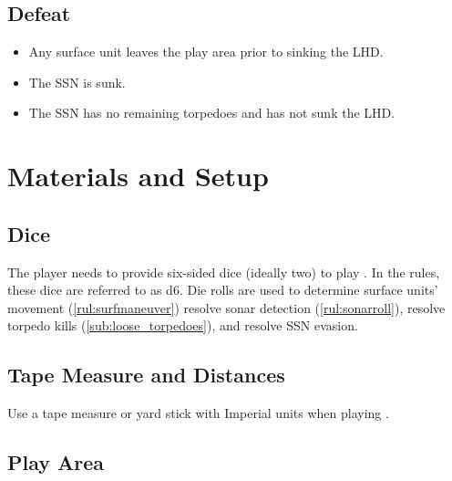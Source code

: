 \documentclass[../TacSubMicroRules.tex]{subfiles}
\begin{document}
\subsection{Defeat}%
\label{sub:defeat}

\begin{itemize}
    \item Any surface unit leaves the play area prior to sinking the LHD.
    \item The SSN is sunk.
    \item The SSN has no remaining torpedoes and has not sunk the LHD.
\end{itemize}

\section{Materials and Setup}%
\label{sec:materialssetup}


\subsection{Dice}%
\label{sub:external_materials}

The player needs to provide six-sided dice (ideally two) to play \gametitle.
In the rules, these dice are referred to as d6.
Die rolls are used to determine surface units' movement (\ref{rul:surfmaneuver}) resolve sonar detection (\ref{rul:sonarroll}), resolve torpedo kills (\ref{sub:loose_torpedoes}), and resolve SSN evasion.

\subsection{Tape Measure and Distances}%
\label{sub:tape_measure}

Use a tape measure or yard stick with Imperial units when playing \gametitle.

\subsection{Play Area}%
\label{sub:playarea}
\end{document}
